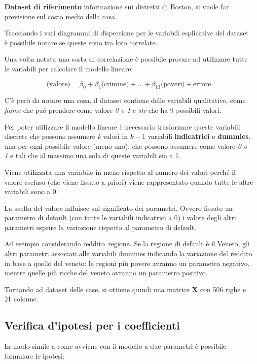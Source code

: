 \textbf{Dataset di riferimento} informazione sui distretti di Boston, si vuole far previsione sul costo medio della casa.

Tracciando i vari diagrammi di dispersione per le variabili esplicative del dataset è possibile notare se queste sono tra loro correlate.

Una volta notata una sorta di correlazione è possibile provare ad utilizzare tutte le variabili per calcolare il modello lineare:

$$
\text{(valore)} = \beta_0 + \beta_1 \text{(crimine)} + \ldots + \beta_13 \text{(poveri)} + \text{errore}
$$

C'è però da notare una cosa, il dataset contiene delle variabili qualitative, come \textit{fiume} che può prendere come valore \textit{0 o 1} e \textit{str} che ha 9 possibili valori.

Per poter utilizzare il modello lineare è necessario trasformare queste variabili discrete che possono assumere \textit{k} valori in $ k -1 $ variabili \textbf{indicatrici} o \textbf{dummies}, una per ogni possibile valore (meno uno), che possono assumere come valore \textit{0 o 1} e tali che al massimo una sola di queste variabili sia a 1.

Viene utilizzata una variabile in meno rispetto al numero dei valori perché il valore escluso (che viene fissato a priori) viene rappresentato quando tutte le altre variabili sono a 0.

La scelta del valore influisce sul significato dei parametri. Ovvero fissato un parametro di default (con tutte le variabili indicatrici a 0) i valore degli altri parametri esprire la variazione rispetto al parametro di default.

Ad esempio considerando reddito~regione. Se la regione di default è il Veneto, gli altri parametri associati alle variabili dummies indicando la variazione del reddito in base a quello del veneto: le regioni più povere avranno un parametro negativo, mentre quelle più ricche del veneto avranno un parametro positivo.

Tornando ad dataset delle case, si ottiene quindi una matrice $ \textbf{X} $ con 506 righe e 21 colonne.

\subsection{Verifica d'ipotesi per i coefficienti}

In modo simile a come avviene con il modello a due parametri è possibile formulare le ipotesi:

